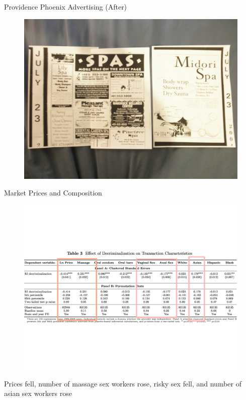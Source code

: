\documentclass{beamer}
\begin{document}
\begin{frame}[shrink=20]{Providence Phoenix Advertising (After)}
	\begin{figure}
	\includegraphics[totalheight=0.95 \textheight]{./lecture_includes/spa_july04.jpg}
	\end{figure}
\end{frame}

\begin{frame}{Market Prices and Composition}
	\begin{figure}
	\includegraphics[scale=0.4]{./lecture_includes/table3.pdf}
	\end{figure}
Prices fell, number of massage sex workers rose, risky sex fell, and number of asian sex workers rose
\end{frame}
\end{document}
